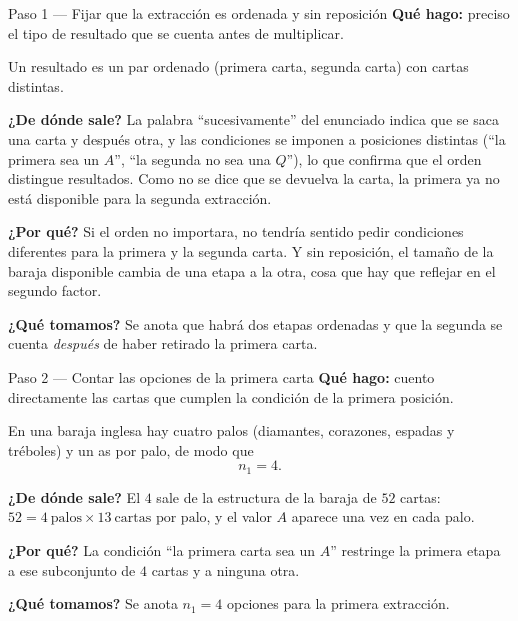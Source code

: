 \documentclass[11pt]{article}
\begin{document}
\begin{paso}{Paso 1 --- Fijar que la extracción es ordenada y sin reposición}
\textbf{Qué hago:} preciso el tipo de resultado que se cuenta antes de multiplicar.

Un resultado es un par ordenado (primera carta, segunda carta) con cartas distintas.

\textbf{¿De dónde sale?} La palabra ``sucesivamente'' del enunciado indica que se saca una carta y después otra, y las condiciones se imponen a posiciones distintas (``la primera sea un $A$'', ``la segunda no sea una $Q$''), lo que confirma que el orden distingue resultados. Como no se dice que se devuelva la carta, la primera ya no está disponible para la segunda extracción.

\textbf{¿Por qué?} Si el orden no importara, no tendría sentido pedir condiciones diferentes para la primera y la segunda carta. Y sin reposición, el tamaño de la baraja disponible cambia de una etapa a la otra, cosa que hay que reflejar en el segundo factor.

\textbf{¿Qué tomamos?} Se anota que habrá dos etapas ordenadas y que la segunda se cuenta \emph{después} de haber retirado la primera carta.
\end{paso}

\begin{paso}{Paso 2 --- Contar las opciones de la primera carta}
\textbf{Qué hago:} cuento directamente las cartas que cumplen la condición de la primera posición.

En una baraja inglesa hay cuatro palos (diamantes, corazones, espadas y tréboles) y un as por palo, de modo que
\[
  n_1=4 .
\]

\textbf{¿De dónde sale?} El $4$ sale de la estructura de la baraja de $52$ cartas: $52=4\ \text{palos}\times 13\ \text{cartas por palo}$, y el valor $A$ aparece una vez en cada palo.

\textbf{¿Por qué?} La condición ``la primera carta sea un $A$'' restringe la primera etapa a ese subconjunto de $4$ cartas y a ninguna otra.

\textbf{¿Qué tomamos?} Se anota $n_1=4$ opciones para la primera extracción.
\end{paso}
\end{document}
